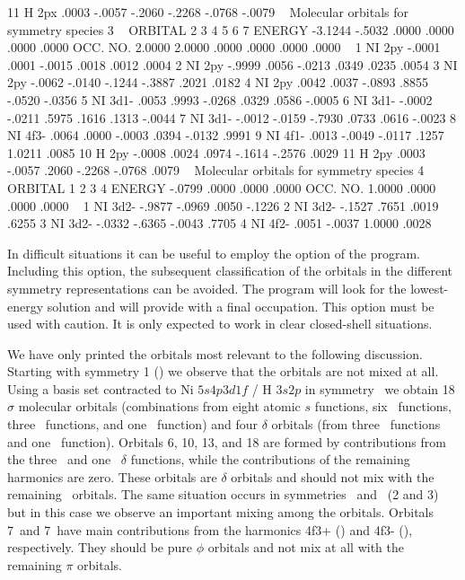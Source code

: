 \begin{sourcelisting}
11 H   2px      .0003    -.0057    -.2060    -.2268    -.0768    -.0079
~
   Molecular orbitals for symmetry species 3 
~
   ORBITAL        2         3         4         5         6         7     
   ENERGY     -3.1244    -.5032     .0000     .0000     .0000     .0000   
   OCC. NO.    2.0000    2.0000     .0000     .0000     .0000     .0000   
~
 1 NI  2py     -.0001     .0001    -.0015     .0018     .0012     .0004  
 2 NI  2py     -.9999     .0056    -.0213     .0349     .0235     .0054 
 3 NI  2py     -.0062    -.0140    -.1244    -.3887     .2021     .0182 
 4 NI  2py      .0042     .0037    -.0893     .8855    -.0520    -.0356  
 5 NI  3d1-     .0053     .9993    -.0268     .0329     .0586    -.0005  
 6 NI  3d1-    -.0002    -.0211     .5975     .1616     .1313    -.0044  
 7 NI  3d1-    -.0012    -.0159    -.7930     .0733     .0616    -.0023  
 8 NI  4f3-     .0064     .0000    -.0003     .0394    -.0132     .9991  
 9 NI  4f1-     .0013    -.0049    -.0117     .1257    1.0211     .0085  
10 H   2py     -.0008     .0024     .0974    -.1614    -.2576     .0029  
11 H   2py      .0003    -.0057     .2060    -.2268    -.0768     .0079  
~
   Molecular orbitals for symmetry species 4 
~
   ORBITAL        1         2         3         4
   ENERGY      -.0799     .0000     .0000     .0000
   OCC. NO.    1.0000     .0000     .0000     .0000
~
 1 NI  3d2-    -.9877    -.0969     .0050    -.1226
 2 NI  3d2-    -.1527     .7651     .0019     .6255
 3 NI  3d2-    -.0332    -.6365    -.0043     .7705
 4 NI  4f2-     .0051    -.0037    1.0000     .0028
\end{sourcelisting}

In difficult situations it can be useful to employ the  option
of the  program. Including this option, the subsequent 
classification of the orbitals in the different symmetry representations
can be avoided. The program will look for the lowest-energy solution and will
provide with a final occupation. This option must be used with caution. It
is only expected to work in clear closed-shell situations.

We have only printed the orbitals most relevant to the following discussion. 
Starting with symmetry 1 (\ao) we observe that the orbitals
are not mixed at all. Using a basis set contracted to Ni $5s4p3d1f$ / H $3s2p$
in symmetry \ao\ we obtain 18 $\sigma$ molecular orbitals (combinations
from eight atomic $s$ functions,
six \pz\ functions, three \dzt\ functions, and one \fztt\ function)
and four $\delta$ orbitals (from three \dxtyt\ functions and one \fz\
function). Orbitals 6, 10, 13, and 18 are formed by contributions from
the three \dxtyt\ and one \fz\ $\delta$ functions, while the
contributions of the remaining harmonics are zero. These orbitals are $\delta$ orbitals
and should not mix with the remaining \ao\ orbitals. 
The same situation occurs in symmetries \bo\ and \bt\ (2 and 3) but in this case
we observe an important mixing among the orbitals. Orbitals 7\bo\ and 7\bt\
have main contributions from the harmonics 4f3+ (\fxtt) and 4f3- (\fytt),
respectively. They should be pure
$\phi$ orbitals and not mix at all with the remaining $\pi$ orbitals.


